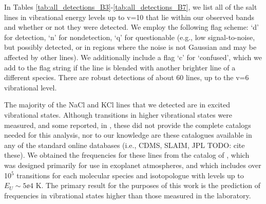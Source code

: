 \documentclass[twocolumn]{aastex62}
\begin{document}
In Tables \ref{tab:all_detections_B3}-\ref{tab:all_detections_B7}, we list
all of the salt lines in vibrational energy levels up to v=10 that lie within our observed bands
and whether or not they were
detected.  We employ the following
flag scheme:
`d' for detection, `n' for nondetection, `q' for questionable (e.g., low
signal-to-noise, but possibly detected, or in regions where the noise is
not Gaussian and may be affected by other lines).
We additionally include a flag `c' for `confused', which we add to the flag
string if the line is blended with another brighter line of a different species.
There are robust detections of about 60 lines, up to the v=6 vibrational level.

The majority of the NaCl and KCl lines that we detected are in excited vibrational states.
Although transitions in higher vibrational states were measured, and some
reported, in \citet{Caris2004a}, these did not provide
the complete catalogs needed for this analysis, nor to our knowledge are these
catalogues available in any of the standard online databases (i.e., CDMS,
SLAIM, JPL {\color{red}TODO: cite these}). 
We obtained the frequencies for these lines from the catalog of \citet{Barton2014a},
which was designed primarily for use in exoplanet
atmospheres, and which includes over 10$^5$ transitions for each
molecular species and isotopologue with levels up to $E_U\sim5\ee{4}$ K. The
primary result for the purposes of this work is the prediction of frequencies
in vibrational states higher than those measured in the laboratory. 



\end{document}
